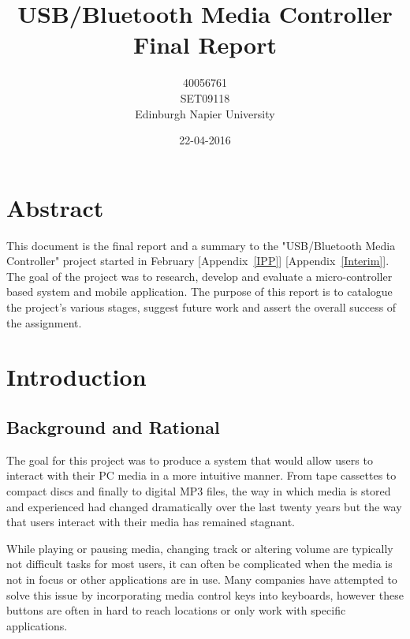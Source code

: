 \documentclass{article}
\title{USB/Bluetooth Media Controller\\Final Report}
\author{40056761\\SET09118\\Edinburgh Napier University}
\date{22-04-2016}
\begin{document}
		
	\maketitle
	
	\section*{Abstract}	
		This document is the final report and a summary to the "USB/Bluetooth Media Controller" project started in February [Appendix~\ref{IPP}] [Appendix~\ref{Interim}]. The goal of the project was to research, develop and evaluate a micro-controller based system and mobile application. The purpose of this report is to catalogue the project’s various stages, suggest future work and assert the overall success of the assignment.
	
				
				
	\newpage
		
		
	\tableofcontents
	
	\listoffigures
	
	\listoftables
	
	\lstlistoflistings
		
	\newpage
		
	\section{Introduction}
		\subsection{Background and Rational}
			The goal for this project was to produce a system that would allow users to interact with their PC media in a more intuitive manner. From tape cassettes to compact discs and finally to digital MP3 files, the way in which media is stored and experienced had changed dramatically over the last twenty years but the way that users interact with their media has remained stagnant.
			
			While playing or pausing media, changing track or altering volume are typically not difficult tasks for most users, it can often be complicated when the media is not in focus or other applications are in use. Many companies have attempted to solve this issue by incorporating media control keys into keyboards, however these buttons are often in hard to reach locations or only work with specific applications.
			
\end{document}
